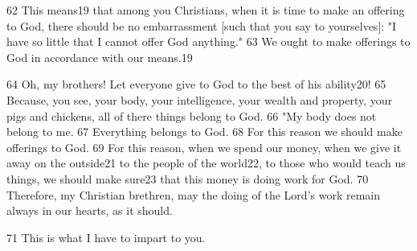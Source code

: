 62 This means19 that among you Christians, when it is time to make an offering
to God, there should be no embarrassment [such that you say to yourselves]: "I
have so little that I cannot offer God anything." 63 We ought to make
offerings to God in accordance with our means.19

64 Oh, my brothers! Let everyone give to God to the best of his ability20! 65 Because,
you see, your body, your intelligence, your wealth and property, your pigs and
chickens, all of there things belong to God. 66 "My body does not belong
to me. 67 Everything belongs to God. 68 For this reason we should make offerings
to God. 69 For this reason, when we spend our money, when we give it away on the
outside21 to the people of the world22, to those who would teach us things, we
should make sure23 that this money is doing work for God. 70 Therefore, my Christian
brethren, may the doing of the Lord's work remain always in our hearts, as it should.

71 This is what I have to impart to you.

